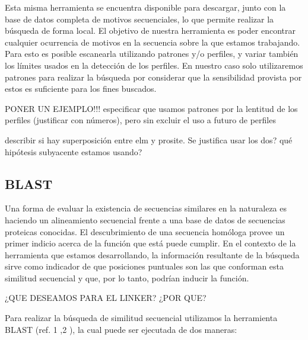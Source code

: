 Esta misma herramienta se encuentra disponible para descargar, junto con la base de datos completa de motivos secuenciales, lo que permite realizar la búsqueda de forma local.
El objetivo de nuestra herramienta es poder encontrar cualquier ocurrencia de motivos en la secuencia sobre la que estamos trabajando. Para esto es posible escanearla utilizando patrones y/o perfiles, y variar también los límites usados en la detección de los perfiles. En nuestro caso solo utilizaremos patrones para realizar la búsqueda por considerar que la sensibilidad provista por estos es suficiente para los fines buscados.

PONER UN EJEMPLO!!! especificar que usamos patrones por la lentitud de los perfiles (justificar con números), pero sin excluir el uso a futuro de perfiles

describir si hay superposición entre elm y prosite. Se justifica usar los dos? qué hipótesis subyacente estamos usando?




\subsection{BLAST}


Una forma de evaluar la existencia de secuencias similares en la naturaleza es haciendo un alineamiento secuencial frente a una base de datos de secuencias proteicas conocidas. El descubrimiento de una secuencia homóloga provee un primer indicio acerca de la función que está puede cumplir. En el contexto de la herramienta que estamos desarrollando, la información resultante de la búsqueda sirve como indicador de que posiciones puntuales son las que conforman esta similitud secuencial y que, por lo tanto, podrían inducir la función. 

¿QUE DESEAMOS PARA EL LINKER? ¿POR QUE?

Para realizar la búsqueda de similitud secuencial utilizamos la herramienta BLAST (ref. 1 ,2 ), la cual puede ser ejecutada de dos maneras:

 
